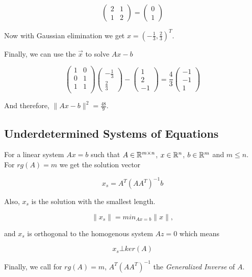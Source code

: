 \[
	\begin{pmatrix}
	2 & 1 \\
	1 & 2
	\end{pmatrix}
	= 
	\begin{pmatrix}
	0 \\
	1
	\end{pmatrix}
\]

Now with Gaussian elimination we get \(x = (-\frac{1}{3}, \frac{2}{3})^T\). 
\vspace{\baselineskip}

Finally, we can use the \(\vec{x}\) to solve \(Ax - b\)

\[
	\begin{pmatrix}
		1 & 0 \\
		0 & 1 \\
		1 & 1 \\
	\end{pmatrix}
	\begin{pmatrix}
		-\frac{1}{3} \\
		\frac{2}{3}
	\end{pmatrix}
	-
	\begin{pmatrix}
		1 \\
		2 \\
		-1
	\end{pmatrix}
	=
	\frac{4}{3}
	\begin{pmatrix}
	-1 \\
	-1 \\
	1
	\end{pmatrix}
\]

And therefore, \(\|Ax - b\|^2 = \frac{48}{9}\).

\subsection{Underdetermined Systems of Equations}

For a linear system \(Ax = b\) such that \(A \in \mathbb{R}^{m \times n}\), \(x\in \mathbb{R}^n\), 
\(b \in \mathbb{R}^m\) and \(m \le n\). For \(rg(A) = m\) we get the solution vector

\[
	x_s = A^T {(A A^T)}^{-1} b
\]

Also, \(x_s\) is the solution with the smallest length. 

\[
	\|x_s\| = min_{Ax = b} \|x\|,
\] 

and \(x_s\) is orthogonal to the homogenous system \(Az = 0\) which means

\[
	x_s \bot ker(A)
\]

Finally, we call for  \(rg(A) = m\), \(A^T {(A A^T)}^{-1}\) the \emph{Generalized Inverse} of \(A\).
\vspace{\baselineskip}

